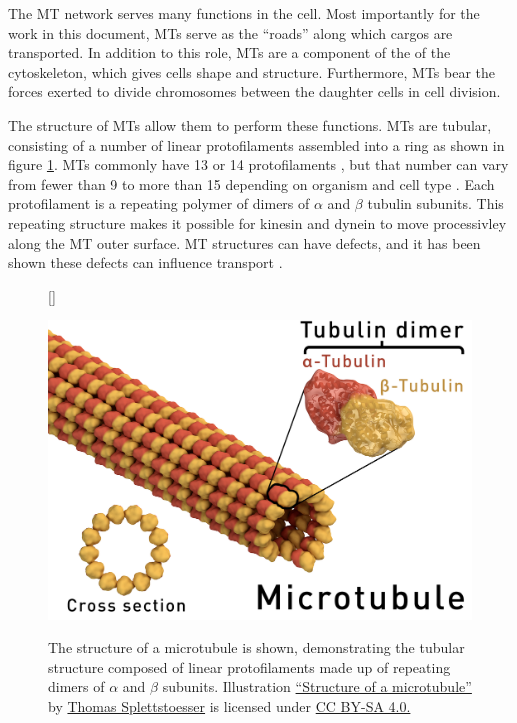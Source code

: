 The MT network serves many functions in the cell. Most importantly for the work in this document, MTs serve as the ``roads'' along which cargos are transported. In addition to this role, MTs are a component of the of the cytoskeleton, which gives cells shape and structure. Furthermore, MTs bear the forces exerted to divide chromosomes between the daughter cells in cell division. 

The structure of MTs allow them to perform these functions. MTs are tubular, consisting of a number of linear protofilaments assembled into a ring \cite{Grimstone1966} as shown in figure \ref{fig:MTstructure}. MTs commonly have 13 or 14 protofilaments \cite{Pierson1978}, but that number can vary from fewer than 9 to more than 15 depending on organism and cell type \cite{Davis1983}. Each protofilament is a repeating polymer of dimers of $\alpha$ and $\beta$ tubulin subunits. This repeating structure makes it possible for kinesin and dynein to move processivley along the MT outer surface. MT structures can have defects, and it has been shown these defects can influence transport \cite{Liang2016}.

\begin{figure}
[\FBwidth]
{\caption[Microtubule Structure]{The structure of a microtubule is shown, demonstrating the tubular structure composed of linear protofilaments made up of repeating dimers of $\alpha$ and $\beta$ subunits. Illustration \href{https://en.wikipedia.org/wiki/Microtubule\#/media/File:Microtubule_structure.png}{``Structure of a microtubule''} by \href{https://commons.wikimedia.org/wiki/User:Splette}{Thomas Splettstoesser} is licensed under \href{https://creativecommons.org/licenses/by-sa/4.0/}{CC BY-SA 4.0.}}
\label{fig:MTstructure}}
{\includegraphics[scale=.1]{background/Microtubule_structure}}
\end{figure}


